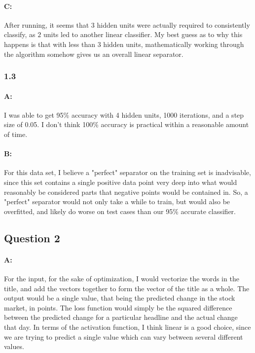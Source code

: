 \documentclass{article}
\begin{document}
\paragraph{C: } After running, it seems that $3$ hidden units were actually required to consistently classify, as $2$ units led to another linear classifier. My best guess as to why this happens is that with less than $3$ hidden units, mathematically working through the algorithm somehow gives us an overall linear separator.

\subsubsection{1.3}

\paragraph{A: } I was able to get 95\% accuracy with 4 hidden units, 1000 iterations, and a step size of 0.05. I don't think 100\% accuracy is practical within a reasonable amount of time.

\paragraph{B: } For this data set, I believe a "perfect" separator on the training set is inadvisable, since this set contains a single positive data point very deep into what would reasonably be considered parts that negative points would be contained in. So, a "perfect" separator would not only take a while to train, but would also be overfitted, and likely do worse on test cases than our 95\% accurate classifier.

\subsection{Question 2}

\paragraph{A: } For the input, for the sake of optimization, I would vectorize the words in the title, and add the vectors together to form the vector of the title as a whole. The output would be a single value, that being the predicted change in the stock market, in points. The loss function would simply be the squared difference between the predicted change for a particular headline and the actual change that day. In terms of the activation function, I think linear is a good choice, since we are trying to predict a single value which can vary between several different values.
\end{document}
